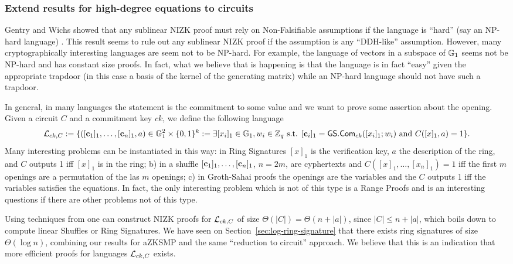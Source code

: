\subsubsection{Extend results for high-degree equations to circuits}
Gentry and Wichs showed that any sublinear NIZK proof must rely on Non-Falsifiable assumptions if the language is ``hard'' (say an NP-hard language) \cite{STOC:GenWic11}. This result seems to rule out any sublinear NIZK proof if the assumption is any ``DDH-like'' assumption. However, many cryptographically interesting languages are seem not to be NP-hard. For example, the language of vectors in a subspace of $\mathbb{G}_1$ seems not be NP-hard and has constant size proofs. In fact, what we believe that is happening is that the language is in fact ``easy'' given the appropriate trapdoor (in this case a basis of the kernel of the generating matrix) while an NP-hard language should not have such a trapdoor.

In general, in many languages the statement is the commitment to some value and we want to prove some assertion about the opening. Given a circuit $C$ and a commitment key $ck$, we define the following language
$$
\mathcal{L}_{ck,C}:= \{([\mathbf{c}_1]_1,\ldots,[\mathbf{c}_n]_1,a)\in\mathbb{G}_1^2\times\{0,1\}^k:= \exists [x_i]_1\in\mathbb{G}_1,w_i\in\mathbb{Z}_q \text{ s.t. } [\mathbf{c}_i]_1={\mathsf{GS}}.\mathsf{Com}_{ck}([x_i]_1;w_i)\text{ and }C([x]_1,a)=1\}.
$$
Many interesting problems can be instantiated in this way: in Ring Signatures $[x]_1$ is the verification key, $a$ the description of the ring, and $C$ outputs 1 iff $[x]_1$ is in the ring; b) in a shuffle $[\mathbf{c}_1]_1,\ldots,[\mathbf{c}_n]_1$, $n=2m$, are cyphertexts and $C([x]_1,\ldots,[x_n]_1)=1$ iff the first $m$ openings are a permutation of the las $m$ openings; c) in Groth-Sahai proofs the openings are the variables and the $C$ outputs 1 iff the variables satisfies the equations. In fact, the only interesting problem which is not of this type is a Range Proofs and is an interesting questions if there are other problems not of this type.

Using techniques from \cite{EC:GroOstSah06} one can construct NIZK proofs for $\mathcal{L}_{ck,C}$ of size $\Theta(|C|)=\Theta(n+|a|)$, since $|C|\leq n+|a|$, which boils down to compute linear Shuffles or Ring Signatures. We have seen on Section~\ref{sec:log-ring-signature} that there exists ring signatures of size $\Theta(\log n)$, combining our results for aZKSMP and the same ``reduction to circuit'' approach. We believe that this is an indication that more efficient proofs for languages $\mathcal{L}_{ck,C}$ exists.

\fi
